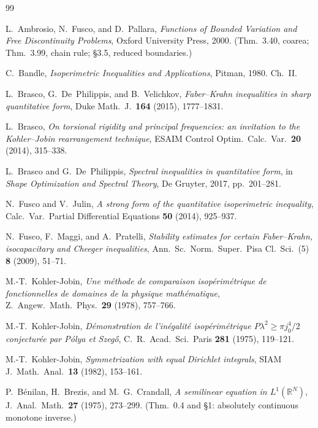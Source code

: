 \documentclass[11pt]{amsart}
\theoremstyle{definition}
\newcommand{\R}{\mathbb R}
\begin{document}
\begin{thebibliography}{99}

L.~Ambrosio, N.~Fusco, and D.~Pallara,
\emph{Functions of Bounded Variation and Free Discontinuity Problems},
Oxford University Press, 2000.
(Thm.~3.40, coarea; Thm.~3.99, chain rule; \S3.5, reduced boundaries.)

C.~Bandle,
\emph{Isoperimetric Inequalities and Applications},
Pitman, 1980. Ch.~II.

L.~Brasco, G.~De~Philippis, and B.~Velichkov,
\emph{Faber--Krahn inequalities in sharp quantitative form},
Duke Math.\ J.\ \textbf{164} (2015), 1777--1831.

L.~Brasco,
\emph{On torsional rigidity and principal frequencies: an invitation to the
Kohler--Jobin rearrangement technique},
ESAIM Control Optim.\ Calc.\ Var.\ \textbf{20} (2014), 315--338.

L.~Brasco and G.~De~Philippis,
\emph{Spectral inequalities in quantitative form}, in
\emph{Shape Optimization and Spectral Theory}, De Gruyter, 2017, pp.~201--281.

N.~Fusco and V.~Julin,
\emph{A strong form of the quantitative isoperimetric inequality},
Calc.\ Var.\ Partial Differential Equations \textbf{50} (2014), 925--937.

N.~Fusco, F.~Maggi, and A.~Pratelli,
\emph{Stability estimates for certain Faber--Krahn, isocapacitary and Cheeger
inequalities},
Ann.\ Sc.\ Norm.\ Super.\ Pisa Cl.\ Sci.\ (5) \textbf{8} (2009), 51--71.

M.-T.~Kohler-Jobin,
\emph{Une m\'ethode de comparaison isop\'erim\'etrique de fonctionnelles de
domaines de la physique math\'ematique},
Z.\ Angew.\ Math.\ Phys.\ \textbf{29} (1978), 757--766.

M.-T.~Kohler-Jobin,
\emph{D\'emonstration de l'in\'egalit\'e isop\'erim\'etrique
\(P\lambda^2\ge\pi j_0^4/2\) conjectur\'ee par P\'olya et Szeg\H{o}},
C.\ R.\ Acad.\ Sci.\ Paris \textbf{281} (1975), 119--121.

M.-T.~Kohler-Jobin,
\emph{Symmetrization with equal Dirichlet integrals},
SIAM J.\ Math.\ Anal.\ \textbf{13} (1982), 153--161.

P.~B\'enilan, H.~Brezis, and M.~G.~Crandall,
\emph{A semilinear equation in \(L^1(\R^N)\)},
J.~Anal.\ Math.\ \textbf{27} (1975), 273--299.
(Thm.~0.4 and \S1: absolutely continuous monotone inverse.)


\end{thebibliography}
\end{document}
